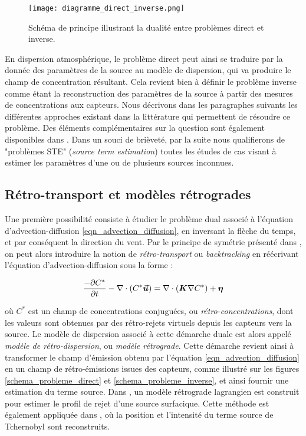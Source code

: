 	\begin{figure}
		\centering
		\texttt{[image: diagramme\_direct\_inverse.png]}
		\caption{Schéma de principe illustrant la dualité entre problèmes direct et inverse.}
		\label{fig_diagramme_direct_inverse}
	\end{figure}
	
	
	En dispersion atmosphérique, le problème direct peut ainsi se traduire par la donnée des paramètres de la source au modèle de dispersion, qui va produire le champ de concentration résultant. Cela revient bien à définir le problème inverse comme étant la reconstruction des paramètres de la source à partir des mesures de concentrations aux capteurs. Nous décrivons dans les paragraphes suivants les différentes approches existant dans la littérature qui permettent de résoudre ce problème. Des éléments complémentaires sur la question sont également disponibles dans \cite{Rao2007}. Dans un souci de brièveté, par la suite nous qualifierons de "problèmes STE" (\textit{source term estimation}) toutes les études de cas visant à estimer les paramètres d'une ou de plusieurs sources inconnues.\\
	
	
 \subsection{{Rétro-transport et modèles rétrogrades}}
 
 Une première possibilité consiste à étudier le problème dual associé à l'équation d'advection-diffusion  \eqref{eqn_advection_diffusion}, en inversant la flèche du temps, et par conséquent la direction du vent.  Par le principe de symétrie présenté dans \cite{Hourdin2006a}, on peut alors introduire la notion de \textit{rétro-transport} ou \textit{backtracking} en  réécrivant l'équation d'advection-diffusion sous la forme : 
 
 \begin{equation}
 \label{eqn_advection_diffusion_backward}
 \dfrac{-\partial C^*}{\partial t} - \nabla \cdot(C^*\bm{\vec{u}}) = \nabla \cdot (\bm{K}\nabla C^*) + {\bm{\eta}}
 \end{equation}
 
 où $C^*$ est un champ de concentrations conjuguées, ou \textit{rétro-concentrations}, dont les valeurs sont obtenues par des rétro-rejets virtuels depuis les capteurs vers la source. Le modèle de dispersion associé à cette démarche duale est alors appelé {\textit{modèle de rétro-dispersion}, ou \textit{modèle rétrograde}}. Cette démarche revient ainsi à transformer le champ d'émission {obtenu par l'équation \eqref{eqn_advection_diffusion}} en un champ de rétro-émissions issues des capteurs, comme illustré sur les figures \ref{schema_probleme_direct} et \ref{schema_probleme_inverse}, et ainsi fournir une estimation du terme source. Dans \cite{Flesch1995}, un modèle {rétrograde} lagrangien est construit pour estimer le profil de rejet d'une source surfacique.  Cette méthode est également appliquée dans \cite{Pudykiewicz1998}, où la position et l'intensité du terme source de Tchernobyl sont reconstruits. 
 
